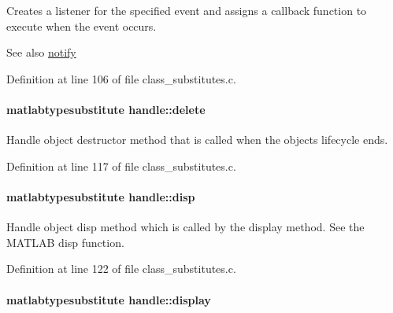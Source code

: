 Creates a listener for the specified event and assigns a callback function to execute when the event occurs. 

\begin{DoxySeeAlso}{See also}
\hyperlink{classhandle_a8cfc3dab9d3ecc55b0b3449c2c7afd6f}{notify} 
\end{DoxySeeAlso}


Definition at line 106 of file class\+\_\+substitutes.\+c.

\paragraph[{\texorpdfstring{delete}{delete}}]{\setlength{\rightskip}{0pt plus 5cm}matlabtypesubstitute handle\+::delete}\hypertarget{classhandle_a1d55d41c7af285b8fe7ab17ed5e176f6}{}\label{classhandle_a1d55d41c7af285b8fe7ab17ed5e176f6}


Handle object destructor method that is called when the object\textquotesingle{}s lifecycle ends. 



Definition at line 117 of file class\+\_\+substitutes.\+c.

\paragraph[{\texorpdfstring{disp}{disp}}]{\setlength{\rightskip}{0pt plus 5cm}matlabtypesubstitute handle\+::disp}\hypertarget{classhandle_adedb524cfbdf6a5d946cc57ef6745099}{}\label{classhandle_adedb524cfbdf6a5d946cc57ef6745099}


Handle object disp method which is called by the display method. See the M\+A\+T\+L\+AB disp function. 



Definition at line 122 of file class\+\_\+substitutes.\+c.

\paragraph[{\texorpdfstring{display}{display}}]{\setlength{\rightskip}{0pt plus 5cm}matlabtypesubstitute handle\+::display}\hypertarget{classhandle_a2e26be32e99b2b98db18bb538638b814}{}\label{classhandle_a2e26be32e99b2b98db18bb538638b814}


